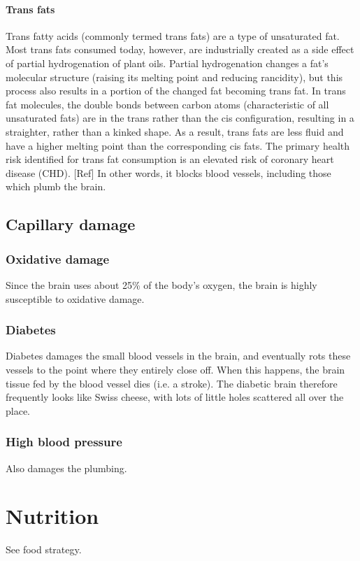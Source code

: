 \documentclass[oneside, article]{memoir}
\begin{document}
\paragraph*{Trans fats}
Trans fatty acids (commonly termed trans fats) are a type of unsaturated fat. Most trans fats consumed today, however, are industrially created as a side effect of partial hydrogenation of plant oils. Partial hydrogenation changes a fat's molecular structure (raising its melting point and reducing rancidity), but this process also results in a portion of the changed fat becoming trans fat. In trans fat molecules, the double bonds between carbon atoms (characteristic of all unsaturated fats) are in the trans rather than the cis configuration, resulting in a straighter, rather than a kinked shape. As a result, trans fats are less fluid and have a higher melting point than the corresponding cis fats. The primary health risk identified for trans fat consumption is an elevated risk of coronary heart disease (CHD).  [Ref] In other words, it blocks blood vessels, including those which plumb the brain.

\subsection{Capillary damage}
\subsubsection{Oxidative damage}
Since the brain uses about 25\% of the body's oxygen, the brain is highly susceptible to oxidative damage.

\subsubsection{Diabetes}
Diabetes damages the small blood vessels in the brain, and eventually rots these vessels to the point where they entirely close off. When this happens, the brain tissue fed by the blood vessel dies (i.e. a stroke). The diabetic brain therefore frequently looks like Swiss cheese, with lots of little holes scattered all over the place.

\subsubsection{High blood pressure}
Also damages the plumbing.

\section{Nutrition}
See food strategy.
\end{document}
